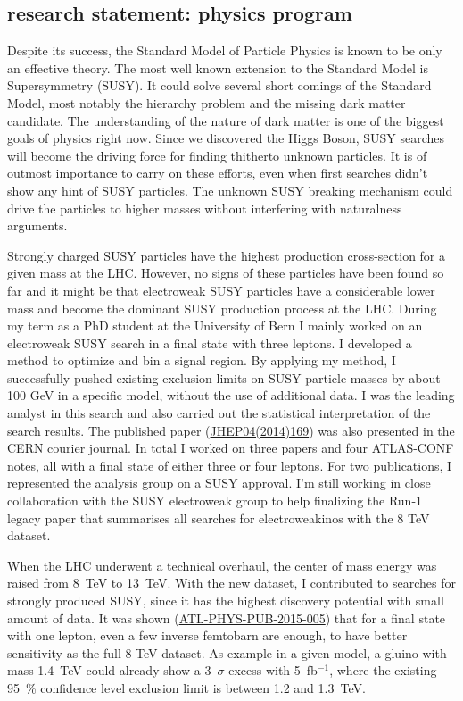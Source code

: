 \documentclass[]{cv} %
\begin{document}
\begin{statement}

\section{research statement: physics program}

Despite its success, the Standard Model of Particle Physics is known to be only
an effective theory. The most well known extension to the Standard Model is
Supersymmetry (SUSY). It could solve several short comings of the Standard
Model, most notably the hierarchy problem and the missing dark matter candidate.
The understanding of the nature of dark matter is one of the biggest goals of
physics right now. Since we discovered the Higgs Boson, SUSY searches will
become the driving force for finding thitherto unknown particles. It is of
outmost importance to carry on these efforts, even when first searches didn't
show any hint of SUSY particles. The unknown SUSY breaking mechanism could drive
the particles to higher masses without interfering with naturalness arguments.

Strongly charged SUSY particles have the highest production cross-section for a
given mass at the LHC. However, no signs of these particles have been found so
far and it might be that electroweak SUSY particles have a considerable lower
mass and become the dominant SUSY production process at the LHC. During my term
as a PhD student at the University of Bern I mainly worked on an electroweak
SUSY search in a final state with three leptons. I developed a method to
optimize and bin a signal region. By applying my method, I successfully pushed
existing exclusion limits on SUSY particle masses by about 100 GeV in a specific
model, without the use of additional data. I was the leading analyst in this
search and also carried out the statistical interpretation of the search
results. The published paper
(\href{http://dx.doi.org/10.1007/JHEP04(2014)169}{JHEP04(2014)169}) was also
presented in the CERN courier journal. In total I worked on three papers and
four ATLAS-CONF notes, all with a final state of either three or four leptons.
For two publications, I represented the analysis group on a SUSY approval. I'm
still working in close collaboration with the SUSY electroweak group to help
finalizing the Run-1 legacy paper that summarises all searches for
electroweakinos with the 8 TeV dataset.

When the LHC underwent a technical overhaul, the center of mass energy was
raised from 8~TeV to 13~TeV. With the new dataset, I contributed to searches for
strongly produced SUSY, since it has the highest discovery potential with small
amount of data. It was shown
(\href{https://cds.cern.ch/record/2002608/}{ATL-PHYS-PUB-2015-005}) that for a
final state with one lepton, even a few inverse femtobarn are enough, to have
better sensitivity as the full 8 TeV dataset. As example in a given model, a
gluino with mass 1.4~TeV could already show a 3~$\sigma$ excess with
5~fb$^{-1}$, where the existing 95~\% confidence level exclusion limit is
between 1.2 and 1.3~TeV.


\end{statement}
\end{document}
